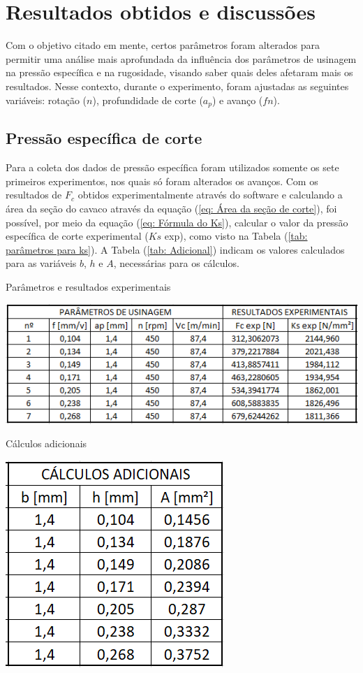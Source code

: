 \documentclass[deposito, acronym, symbols]{fei}
\begin{document}
\chapter{Resultados obtidos e discussões}

Com o objetivo citado em mente, certos parâmetros foram alterados para permitir uma análise mais aprofundada da influência dos parâmetros de usinagem na pressão específica e na rugosidade, visando saber quais deles afetaram mais os resultados. Nesse contexto, durante o experimento, foram ajustadas as seguintes variáveis: rotação ($n$), profundidade de corte ($a_p$) e avanço ($fn$). 



\section{Pressão específica de corte}

Para a coleta dos dados de pressão específica foram utilizados somente os sete primeiros experimentos, nos quais só foram alterados os avanços. Com os resultados de $F_c$ obtidos experimentalmente através do software e calculando a área da seção do cavaco através da equação (\ref{eq: Área da seção de corte}), foi possível, por meio da equação (\ref{eq: Fórmula do Ks}), calcular o valor da pressão específica de corte experimental ($Ks$ exp), como visto na Tabela (\ref{tab: parâmetros para ks}).  
A Tabela (\ref{tab: Adicional}) indicam os valores calculados para as variáveis $b$, $h$ e $A$, necessárias para os cálculos.

\begin{table}[!htb]
 \centering
    \caption{Parâmetros e resultados experimentais}
    \includegraphics[width=0.85\linewidth]{Imagens/Tabela parâmetros e resultados ex.png}
    \label{tab: parâmetros para ks}
 \end{table}


\begin{table}[!htb]
 \centering
    \caption{Cálculos adicionais}
    \includegraphics[width=0.3\linewidth]{Imagens/tabela calculos adic.png}
    \label{tab: Adicional}
 \end{table}
 
\end{document}
